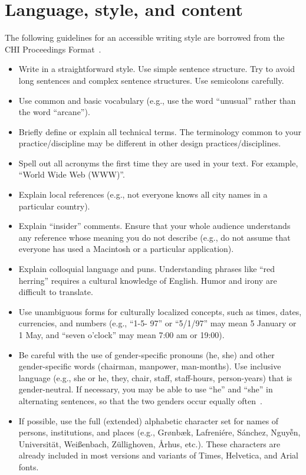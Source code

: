 \documentclass{article}
\begin{document}
\section{Language, style, and content}

The following guidelines for an accessible writing style are borrowed from the CHI Proceedings Format~\cite{CHI}.

\begin{itemize}
\item Write in a straightforward style. Use simple sentence
  structure. Try to avoid long sentences and complex sentence
  structures. Use semicolons carefully.
\item Use common and basic vocabulary (e.g., use the word ``unusual''
  rather than the word ``arcane'').
\item Briefly define or explain all technical terms. The terminology
  common to your practice/discipline may be different in other design
  practices/disciplines.
\item Spell out all acronyms the first time they are used in your
  text. For example, ``World Wide Web (WWW)''.
\item Explain local references (e.g., not everyone knows all city
  names in a particular country).
\item Explain ``insider'' comments. Ensure that your whole audience
  understands any reference whose meaning you do not describe (e.g.,
  do not assume that everyone has used a Macintosh or a particular
  application).
\item Explain colloquial language and puns. Understanding phrases like
  ``red herring'' requires a cultural knowledge of English. Humor and
  irony are difficult to translate.
\item Use unambiguous forms for culturally localized concepts, such as
  times, dates, currencies, and numbers (e.g., ``1-5- 97'' or
  ``5/1/97'' may mean 5 January or 1 May, and ``seven o'clock'' may
  mean 7:00 am or 19:00).
\item Be careful with the use of gender-specific pronouns (he, she)
  and other gender-specific words (chairman, manpower,
  man-months). Use inclusive language (e.g., she or he, they, chair,
  staff, staff-hours, person-years) that is gender-neutral. If
  necessary, you may be able to use ``he'' and ``she'' in alternating
  sentences, so that the two genders occur equally
  often~\cite{Schwartz:1995:GBF}.
\item If possible, use the full (extended) alphabetic character set
  for names of persons, institutions, and places (e.g.,
  Gr{\o}nb{\ae}k, Lafreni\'ere, S\'anchez, Nguy{\~{\^{e}}}n,
  Universit{\"a}t, Wei{\ss}enbach, Z{\"u}llighoven, \r{A}rhus, etc.).
  These characters are already included in most versions and variants
  of Times, Helvetica, and Arial fonts.
\end{itemize}
\end{document}
